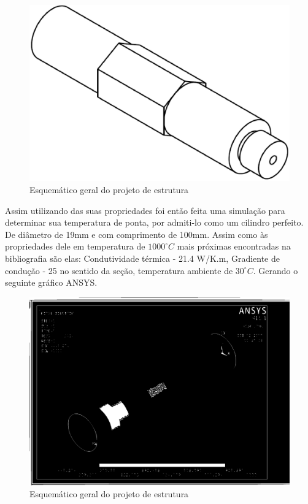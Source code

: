 \begin{figure}[!htb]                                                               
   \centering                                                                      
   \includegraphics[keepaspectratio=true]{figuras/Parte1.eps}
   \caption{Esquemático geral do projeto de estrutura}                        
\end{figure}

Assim utilizando das suas propriedades foi então feita uma simulação para determinar sua temperatura de ponta, por admiti-lo como um cilindro perfeito. De diâmetro de 19mm e com comprimento de 100mm. Assim como às propriedades dele em temperatura de $1000^{\circ}C$ mais próximas encontradas na bibliografia são elas: Condutividade térmica - 21.4 W/K.m, Gradiente de condução - 25 no sentido da seção, temperatura ambiente de $30^{\circ}C$. Gerando o seguinte gráfico ANSYS.

\begin{figure}[!htb]                                                               
   \centering                                                                      
   \includegraphics[width=15cm, keepaspectratio=true]{figuras/Resultado1.eps}
   \caption{Esquemático geral do projeto de estrutura}                        
\end{figure}

